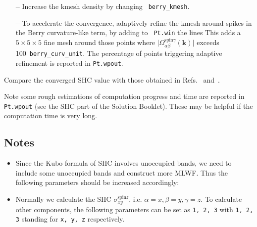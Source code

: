 \documentclass[a4paper,11pt,twoside]{article}
\begin{document}
\begin{itemize}
	
	\item[{\bf --}] Increase the kmesh density by changing {\tt
		berry\_kmesh}.
	
	\item[{\bf --}] To accelerate the convergence, adaptively refine the
	kmesh around spikes in the Berry curvature-like term, by adding to {\tt
		Pt.win} the lines 
	This adds a $5\times 5\times 5$ fine mesh around those points
	where $\vert{\Omega_{\alpha\beta}^{\text{spin}\gamma}}({\bm k})\vert$ exceeds 100~{\tt berry\_curv\_unit}. The
	percentage of points triggering adaptive refinement is reported in
	{\tt Pt.wpout}.
	
\end{itemize}



Compare the converged SHC value with those obtained in
Refs.~\cite{qiao-prb2018} and~\cite{guo-prl2008}. 

Note some rough estimations of computation progress and time are reported in {\tt Pt.wpout} 
(see the SHC part of the Solution Booklet). These may be helpful if the computation time is very long. 

\subsection*{Notes}
%
\begin{itemize}
	\item Since the Kubo formula of SHC involves unoccupied bands, 
	we need to include some unoccupied bands and construct more MLWF. 
	Thus the following parameters should be increased accordingly:
	\item Normally we calculate the SHC  
	$\sigma_{xy}^{\text{spin}z}$, 
	i.e. $\alpha = x, \beta = y, \gamma = z$. To calculate other components, the following parameters can be set as 
	{\tt 1, 2, 3} 
	with {\tt 1, 2, 3} standing for {\tt x, y, z} respectively.
\end{itemize}
\end{document}
